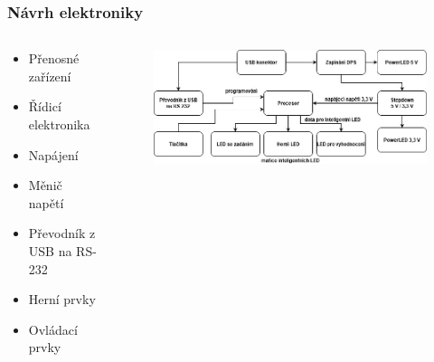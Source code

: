 \documentclass[%
  12pt,       				%
	t,                  %
	aspectratio=1610,   %
	unicode,						%
]{beamer}				    	%
\begin{document}


\begin{frame} 
	\frametitle{Návrh elektroniky}
	
	\begin{columns}[T] 								%
		\begin{column}{0.45\textwidth}		%
			\vspace{0.5cm}
			\begin{itemize}
				\item Přenosné zařízení
				\item Řídicí elektronika
				\item Napájení
				\item Měnič napětí
				\item Převodník z USB na RS-232
				\item Herní prvky
				\item Ovládací prvky
			\end{itemize}
		\end{column}
		\begin{column}{0.55\textwidth}		%
			\begin{figure}%
				\centering
				\vspace{1cm}	              %
				\includegraphics[width=1\columnwidth]{obrazky/v1_blokove_schema.jpg}
			\end{figure}
		\end{column}
	\end{columns}											%
\end{frame}
\end{document}
